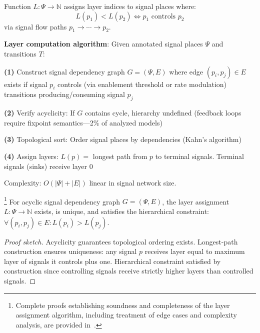 \begin{definition}
Function $L: \Psi \to \mathbb{N}$ assigns layer indices to signal places where:
\begin{equation}
\label{eq:layer_assignment}
L(p_1) < L(p_2) \iff p_1 \text{ controls } p_2
\end{equation}
via signal flow paths $p_1 \to \cdots \to p_2$.
\end{definition}

\vspace{3pt}
\noindent\textbf{Layer computation algorithm}: Given annotated signal places $\Psi$ and transitions $T$:

\vspace{2pt}
\noindent\textbf{(1)} Construct signal dependency graph $G = (\Psi, E)$ where edge $(p_i, p_j) \in E$ exists if signal $p_i$ controls (via enablement threshold or rate modulation) transitions producing/consuming signal $p_j$

\vspace{2pt}
\noindent\textbf{(2)} Verify acyclicity: If $G$ contains cycle, hierarchy undefined (feedback loops require fixpoint semantics---2\% of analyzed models)

\vspace{2pt}
\noindent\textbf{(3)} Topological sort: Order signal places by dependencies (Kahn's algorithm)

\vspace{2pt}
\noindent\textbf{(4)} Assign layers: $L(p) = $ longest path from $p$ to terminal signals. Terminal signals (sinks) receive layer 0

\vspace{3pt}
\noindent Complexity: $O(|\Psi| + |E|)$ linear in signal network size.

\begin{theorem}\footnote{Complete proofs establishing soundness and completeness of the layer assignment algorithm, including treatment of edge cases and complexity analysis, are provided in~\cite{subtilis2026}.}
For acyclic signal dependency graph $G = (\Psi, E)$, the layer assignment $L: \Psi \to \mathbb{N}$ exists, is unique, and satisfies the hierarchical constraint: $\forall (p_i, p_j) \in E: L(p_i) > L(p_j)$.
\end{theorem}

\begin{proof}[Proof sketch]
Acyclicity guarantees topological ordering exists. Longest-path construction ensures uniqueness: any signal $p$ receives layer equal to maximum layer of signals it controls plus one. Hierarchical constraint satisfied by construction since controlling signals receive strictly higher layers than controlled signals.
\end{proof}

